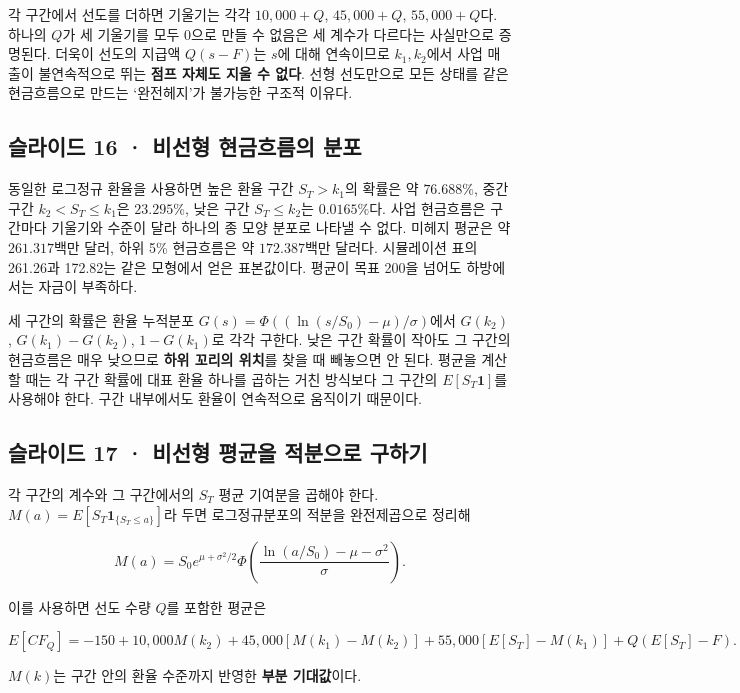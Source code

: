 \documentclass[11pt,a4paper]{article}
\begin{document}
각 구간에서 선도를 더하면 기울기는 각각 $10{,}000+Q$, $45{,}000+Q$, $55{,}000+Q$다. 하나의 $Q$가 세 기울기를 모두 0으로 만들 수 없음은 세 계수가 다르다는 사실만으로 증명된다. 더욱이 선도의 지급액 $Q(s-F)$는 $s$에 대해 연속이므로 $k_1,k_2$에서 사업 매출이 불연속적으로 뛰는 \textbf{점프 자체도 지울 수 없다}. 선형 선도만으로 모든 상태를 같은 현금흐름으로 만드는 ‘완전헤지’가 불가능한 구조적 이유다.\par

\subsection{슬라이드 16 · 비선형 현금흐름의 분포}
동일한 로그정규 환율을 사용하면 높은 환율 구간 $S_T>k_1$의 확률은 약 $76.688\%$, 중간 구간 $k_2<S_T\leq k_1$은 $23.295\%$, 낮은 구간 $S_T\leq k_2$는 $0.0165\%$다. 사업 현금흐름은 구간마다 기울기와 수준이 달라 하나의 종 모양 분포로 나타낼 수 없다. 미헤지 평균은 약 $261.317$백만 달러, 하위 5\% 현금흐름은 약 $172.387$백만 달러다. 시뮬레이션 표의 261.26과 172.82는 같은 모형에서 얻은 표본값이다. 평균이 목표 200을 넘어도 하방에서는 자금이 부족하다.\par

세 구간의 확률은 환율 누적분포 $G(s)=\Phi((\ln(s/S_0)-\mu)/\sigma)$에서 $G(k_2)$, $G(k_1)-G(k_2)$, $1-G(k_1)$로 각각 구한다. 낮은 구간 확률이 작아도 그 구간의 현금흐름은 매우 낮으므로 \textbf{하위 꼬리의 위치}를 찾을 때 빼놓으면 안 된다. 평균을 계산할 때는 각 구간 확률에 대표 환율 하나를 곱하는 거친 방식보다 그 구간의 $E[S_T\mathbf1]$를 사용해야 한다. 구간 내부에서도 환율이 연속적으로 움직이기 때문이다.\par

\subsection{슬라이드 17 · 비선형 평균을 적분으로 구하기}
각 구간의 계수와 그 구간에서의 $S_T$ 평균 기여분을 곱해야 한다. $M(a)=E[S_T\mathbf1_{\{S_T\leq a\}}]$라 두면 로그정규분포의 적분을 완전제곱으로 정리해\par

\[
M(a)=S_0e^{\mu+\sigma^2/2}
\Phi\!\left(\frac{\ln(a/S_0)-\mu-\sigma^2}{\sigma}\right).
\]

이를 사용하면 선도 수량 $Q$를 포함한 평균은\par

\[
E[CF_Q]=-150+10{,}000M(k_2)+45{,}000[M(k_1)-M(k_2)]
+55{,}000[E[S_T]-M(k_1)]+Q(E[S_T]-F).
\]

$M(k)$는 구간 안의 환율 수준까지 반영한 \textbf{부분 기대값}이다.\par
\end{document}
